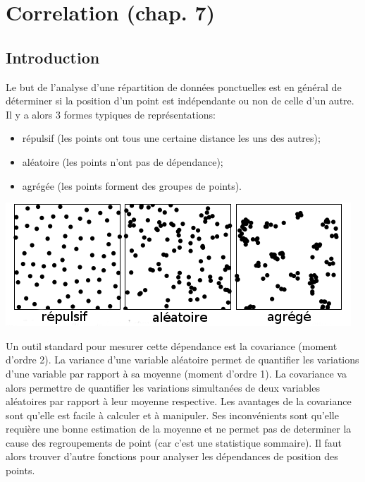 \documentclass[french,12pt,a4paper]{report}
\begin{document}
\chapter{Correlation (chap. 7)}

\section{Introduction}

Le but de l'analyse d'une répartition de données ponctuelles est en général de déterminer si la position d'un point est indépendante ou non de celle d'un autre. Il y a alors 3 formes typiques de représentations:
\begin{itemize}
\item répulsif (les points ont tous une certaine distance les uns des autres);
\item aléatoire (les points n'ont pas de dépendance);
\item agrégée (les points forment des groupes de points).\\
\end{itemize}

\begin{center} \includegraphics[scale=0.8]{images/repartition.png} \end{center}

Un outil standard pour mesurer cette dépendance est la covariance (moment d'ordre 2). La variance d'une variable aléatoire permet de quantifier les variations d’une variable par rapport à sa moyenne (moment d'ordre 1). La covariance va alors permettre de quantifier les variations simultanées de deux variables aléatoires par rapport à leur moyenne respective.
Les avantages de la covariance sont qu'elle est facile à calculer et à manipuler. Ses inconvénients sont qu'elle requière une bonne estimation de la moyenne  et ne permet pas de determiner la cause des regroupements de point (car c'est une statistique sommaire).
Il faut alors trouver d'autre fonctions pour analyser les dépendances de position des points.\\
\end{document}

